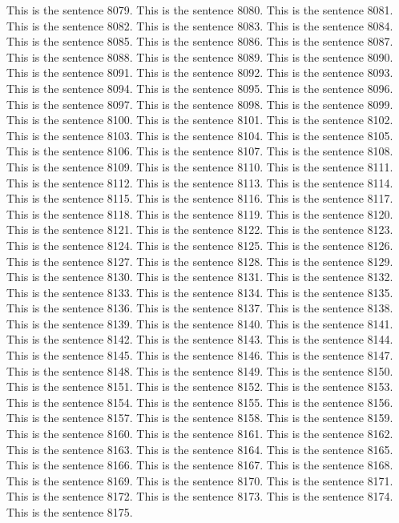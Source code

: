 \documentclass{article}
\begin{document}
This is the sentence 8079.
This is the sentence 8080.
This is the sentence 8081.
This is the sentence 8082.
This is the sentence 8083.
This is the sentence 8084.
This is the sentence 8085.
This is the sentence 8086.
This is the sentence 8087.
This is the sentence 8088.
This is the sentence 8089.
This is the sentence 8090.
This is the sentence 8091.
This is the sentence 8092.
This is the sentence 8093.
This is the sentence 8094.
This is the sentence 8095.
This is the sentence 8096.
This is the sentence 8097.
This is the sentence 8098.
This is the sentence 8099.
This is the sentence 8100.
This is the sentence 8101.
This is the sentence 8102.
This is the sentence 8103.
This is the sentence 8104.
This is the sentence 8105.
This is the sentence 8106.
This is the sentence 8107.
This is the sentence 8108.
This is the sentence 8109.
This is the sentence 8110.
This is the sentence 8111.
This is the sentence 8112.
This is the sentence 8113.
This is the sentence 8114.
This is the sentence 8115.
This is the sentence 8116.
This is the sentence 8117.
This is the sentence 8118.
This is the sentence 8119.
This is the sentence 8120.
This is the sentence 8121.
This is the sentence 8122.
This is the sentence 8123.
This is the sentence 8124.
This is the sentence 8125.
This is the sentence 8126.
This is the sentence 8127.
This is the sentence 8128.
This is the sentence 8129.
This is the sentence 8130.
This is the sentence 8131.
This is the sentence 8132.
This is the sentence 8133.
This is the sentence 8134.
This is the sentence 8135.
This is the sentence 8136.
This is the sentence 8137.
This is the sentence 8138.
This is the sentence 8139.
This is the sentence 8140.
This is the sentence 8141.
This is the sentence 8142.
This is the sentence 8143.
This is the sentence 8144.
This is the sentence 8145.
This is the sentence 8146.
This is the sentence 8147.
This is the sentence 8148.
This is the sentence 8149.
This is the sentence 8150.
This is the sentence 8151.
This is the sentence 8152.
This is the sentence 8153.
This is the sentence 8154.
This is the sentence 8155.
This is the sentence 8156.
This is the sentence 8157.
This is the sentence 8158.
This is the sentence 8159.
This is the sentence 8160.
This is the sentence 8161.
This is the sentence 8162.
This is the sentence 8163.
This is the sentence 8164.
This is the sentence 8165.
This is the sentence 8166.
This is the sentence 8167.
This is the sentence 8168.
This is the sentence 8169.
This is the sentence 8170.
This is the sentence 8171.
This is the sentence 8172.
This is the sentence 8173.
This is the sentence 8174.
This is the sentence 8175.
\end{document}
